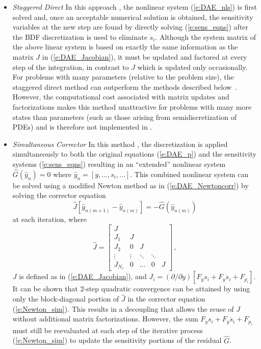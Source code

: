 \begin{itemize}

\item {\em Staggered Direct}
  In this approach \cite{CaSt:85}, the nonlinear system (\ref{e:DAE_nls}) is first
  solved and, once an acceptable numerical solution is obtained, the sensitivity 
  variables at the new step are found by directly solving (\ref{e:sens_eqns}) 
  after the BDF discretization is used to eliminate ${\dot s}_i$. 
  Although the system matrix of the above linear system is based on exactly the same
  information as the matrix $J$ in (\ref{e:DAE_Jacobian}), it must be updated and
  factored at every step of the integration, in contrast to $J$ which is updated
  only occasionally.  For problems with many parameters (relative to the problem
  size), the staggered direct method can outperform the methods described
  below~\cite{LPZ:99}.
  However, the computational cost associated with matrix updates and factorizations 
  makes this method unattractive for problems with many more states than parameters
  (such as those arising from semidiscretization of PDEs) and is therefore not 
  implemented in {\idas}.
  
\item {\em Simultaneous Corrector}
  In this method \cite{MaPe:97}, the discretization is applied simultaneously
  to both the original equations (\ref{e:DAE_p}) and the sensitivity systems
  (\ref{e:sens_eqns}) resulting in an ``extended'' nonlinear system ${\hat G}({\hat y}_n) = 0$
  where ${\hat y_n} = [ y, \ldots, s_i, \ldots ]$.
  This combined nonlinear system can be solved using a modified Newton method as in
  (\ref{e:DAE_Newtoncorr}) by solving the corrector equation
  \begin{equation}\label{e:Newton_sim}
    {\hat J}[{\hat y}_{n(m+1)}-{\hat y}_{n(m)}]=-{\hat G}({\hat y}_{n(m)})
  \end{equation}
  at each iteration, where 
  \begin{equation*}
    {\hat J} = 
    \begin{bmatrix}
      J       &        &        &        &   \\
      J_1     & J      &        &        &   \\
      J_2     & 0      & J      &        &   \\
      \vdots  & \vdots & \ddots & \ddots &   \\
      J_{N_s} & 0      & \ldots & 0      & J 
    \end{bmatrix} \, ,
  \end{equation*}
  $J$ is defined as in (\ref{e:DAE_Jacobian}), and 
  $J_i = ({\partial}/{\partial y})\left[ F_y s_i + F_{\dot y} {\dot s_i} + F_{p_i} \right]$.
  It can be shown that 2-step quadratic convergence can be attained by using
  only the block-diagonal portion of ${\hat J}$ in the corrector equation
  (\ref{e:Newton_sim}). This results in a decoupling that allows the reuse of 
  $J$ without additional matrix factorizations. However, the sum
  $F_y s_i + F_{\dot y} {\dot s_i} + F_{p_i}$ must still be reevaluated at 
  each step of the iterative process (\ref{e:Newton_sim}) to update the 
  sensitivity portions of the residual ${\hat G}$.
  

\end{itemize}

